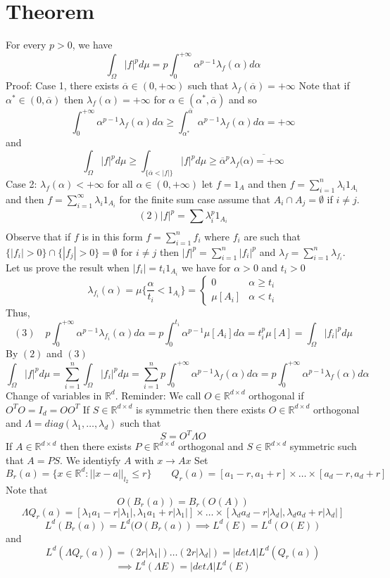 \documentclass[11pt]{article}
\begin{document}
\section{Theorem}
For every $p > 0$, we have
\[
\int_{\Omega}^{}|f|^{p} d \mu = p \int_{0}^{+\infty}\alpha^{p-1}\lambda_f(\alpha) d \alpha
\] 
Proof: Case 1, there exists $\overline{\alpha} \in (0, +\infty)$ such that $\lambda_f(\overline{\alpha}) = +\infty$ Note that if $\alpha^{*} \in (0, \overline{ \alpha})$ then $\lambda_f(\alpha) = +\infty$ for $\alpha \in (\alpha^{*}, \overline{ \alpha})$
and so
\[
\int_{0}^{+\infty}\alpha^{p-1}\lambda_f(\alpha) d \alpha \ge \int_{\alpha^{*}}^{\overline{\alpha}} \alpha^{p-1} \lambda_f(\alpha) d \alpha = + \infty
\] 
and
\[
    \int_{\Omega}^{}|f|^{p}d \mu \ge \int_{\{\overline{\alpha} < |f|\}}^{}|f|^{p} d \mu \ge \overline{\alpha}^{p} \lambda_f( \overline{ \alpha) = +\infty}
\] 
Case 2: $\lambda_f(\alpha) < +\infty$ for all $\alpha \in (0, +\infty)$ let  $f = 1_A$ and then $f = \sum_{i=1}^{n}\lambda_i 1_{A_i}$ and then $f = \sum_{i=1}^{\infty}\lambda_i 1_{A_i}$ for the finite sum case assume that $A_i \cap A_j = \emptyset$ if  $i \ne j$.
 \[
     (2)    |f|^{p} = \sum_{}^{}\lambda_i^{p} 1_{A_i}
\] 
Observe that if $f$ is in this form $f = \sum_{i=1}^{n}f_i$ where $f_i$ are such that  $\{|f_i| > 0\} \cap \{|f_j| > 0\} = \emptyset$ for  $i \ne j$
then  $|f|^{p} = \sum_{i=1}^{n}|f_i|^{p}$ and $\lambda_f = \sum_{i=1}^{n} \lambda_{f_i}$.
Let us prove the result when $|f_i| = t_i1_{A_i}$ we have for $\alpha > 0$ and $t_i > 0$
 \[
     \lambda_{f_i}(\alpha) = \mu\{ \frac{\alpha}{t_i} < 1_{A_i}\} = 
     \begin{cases}
         0 & \alpha \ge t_i\\
         \mu[A_i] & \alpha < t_i
     \end{cases}
\] 
Thus,
\[
    (3) \quad    p \int_{0}^{+\infty}\alpha^{p-1} \lambda_{f_i}(\alpha) d \alpha = p \int_{0}^{t_i} \alpha^{p-1} \mu[A_i] d \alpha = t_i^{p} \mu[A] = \int_{\Omega}^{}|f_i|^{p} d \mu
\] 
By $(2)$ and  $(3)$
 \[
\int_{\Omega}^{}|f|^{p} d\mu = \sum_{i=1}^{n} \int_{\Omega}^{}|f_i|^{p} d\mu = \sum_{i=1}^{n} p \int_{0}^{+\infty} \alpha^{p-1}\lambda_f(\alpha) d \alpha = p \int_{0}^{+\infty} \alpha^{p-1} \lambda_f(\alpha) d \alpha
\] 
Change of variables in $ \mathbb{R}^{d}$. Reminder: We call $O \in \mathbb{R}^{d \times d}$ orthogonal if $O^{T}O = I_d = OO^{T}$ 
If $S \in \mathbb{R}^{d \times d}$ is symmetric then there exists $O \in \mathbb{R}^{d\times d}$ orthogonal and $\Lambda = diag(\lambda_1,\dots,\lambda_d)$ such that
\[
S = O^{T} \Lambda O
\] 
If $A \in \mathbb{R}^{d \times d}$ then there exists $P \in \mathbb{R}^{d \times d}$ orthogonal and $S \in \mathbb{R}^{d \times d}$ symmetric such that $A = PS$.
We identiyfy $A$ with  $x \to Ax$
Set 
\[
    B_r(a) = \{x \in \mathbb{R}^{d} : ||x -a||_{l_2} \le r\} \qquad Q_r(a) = [a_1-r,a_1+r] \times \dots \times [a_d - r, a_d + r]
\] 
Note that
\[
O(B_r(a)) = B_r(O(A))
\] 
\[
    \Lambda Q_r(a) = [\lambda_1 a_1 - r |\lambda_1|, \lambda_1 a_1 + r|\lambda_1|] \times \dots \times [\lambda_d a_d - r |\lambda_d|, \lambda_d a_d + r |\lambda_d|]
\] 
\[
L^{d}(B_r(a)) = L^{d}(O(B_r(a)) \implies L^{d}(E) = L^{d}(O(E))
\] 
and
\[
L^{d}(\Lambda Q_r(a)) = (2r |\lambda_1|) \dots (2r |\lambda_d|) = |det \Lambda| L^{d}(Q_r(a)) 
\] 
\[
\implies L^{d}(\Lambda E) = |det \Lambda| L^{d}(E)
\] 
\end{document}
